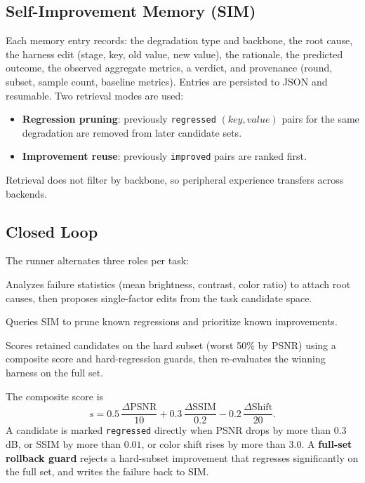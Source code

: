 \documentclass[11pt,letterpaper]{article}
\begin{document}
\subsection{Self-Improvement Memory (SIM)}
Each memory entry records: the degradation type and backbone, the root cause, the harness edit
(stage, key, old value, new value), the rationale, the predicted outcome, the observed
aggregate metrics, a verdict, and provenance (round, subset, sample count, baseline metrics).
Entries are persisted to JSON and resumable. Two retrieval modes are used:
\begin{itemize}[leftmargin=*]
  \item \textbf{Regression pruning}: previously \texttt{regressed} $(key, value)$ pairs for
        the same degradation are removed from later candidate sets.
  \item \textbf{Improvement reuse}: previously \texttt{improved} pairs are ranked first.
\end{itemize}
Retrieval does not filter by backbone, so peripheral experience transfers across
backends.

\subsection{Closed Loop}
The runner alternates three roles per task:
\begin{description}[leftmargin=*]
  \item[Proposer.] Analyzes failure statistics (mean brightness, contrast, color ratio) to
        attach root causes, then proposes single-factor edits from the task candidate space.
  \item[Selector.] Queries SIM to prune known regressions and prioritize known improvements.
  \item[Evaluator.] Scores retained candidates on the hard subset (worst 50\% by PSNR) using a
        composite score and hard-regression guards, then re-evaluates the winning harness on
        the full set.
\end{description}
The composite score is
\begin{equation}
  s = 0.5\,\frac{\Delta\mathrm{PSNR}}{10}
    + 0.3\,\frac{\Delta\mathrm{SSIM}}{0.2}
    - 0.2\,\frac{\Delta\mathrm{Shift}}{20}.
\end{equation}
A candidate is marked \texttt{regressed} directly when PSNR drops by more than $0.3$\,dB, or
SSIM by more than $0.01$, or color shift rises by more than $3.0$. A \textbf{full-set rollback
guard} rejects a hard-subset improvement that regresses significantly on the full set, and
writes the failure back to SIM.
\end{document}

